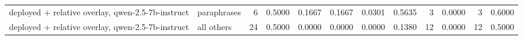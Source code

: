 \begin{tabular}{llrrrrrrrrrr}
deployed + relative overlay, qwen-2.5-7b-instruct &                paraphrases &  6 &         0.5000 &      0.1667 &        0.1667 &          0.0301 &          0.5635 &           3 &                       0.0000 &                   3 &                                  0.6000 \\
deployed + relative overlay, qwen-2.5-7b-instruct &                 all others & 24 &         0.5000 &      0.0000 &        0.0000 &          0.0000 &          0.1380 &          12 &                       0.0000 &                  12 &                                  0.5000 \\
\bottomrule
\end{tabular}
